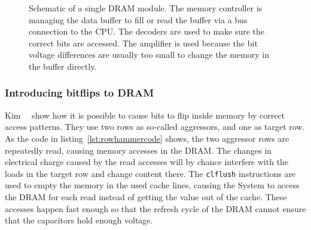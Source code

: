 \begin{figure}
  \centering
  \caption{Schematic of a single DRAM module. The memory controller is managing
the data buffer to fill or read the buffer via a bus connection to the CPU. The
decoders are used to make sure the correct bits are accessed. The amplifier is
used because the bit voltage differences are usually too small to change the
memory in the buffer directly.}
  \label{fig:DRAMscheme}
\end{figure}

\subsubsection{Introducing bitflips to DRAM}

Kim~\etal~\cite{rowhammergeneral} show how it is possible to cause bits to flip
inside memory by correct access patterns. They use two rows as so-called
aggressors, and one as target row. As the code in
listing~\ref{lst:rowhammercode} shows, the two aggressor rows are repeatedly
read, causing memory accesses in the DRAM. The changes in electrical charge
caused by the read accesses will by chance interfere with the loads in the
target row and change content there. The \texttt{clflush} instructions are used
to empty the memory in the used cache lines, causing the System to access the
DRAM for each read instead of getting the value out of the cache. These accesses
happen fast enough so that the refresh cycle of the DRAM cannot ensure that the
capacitors hold enough voltage.

